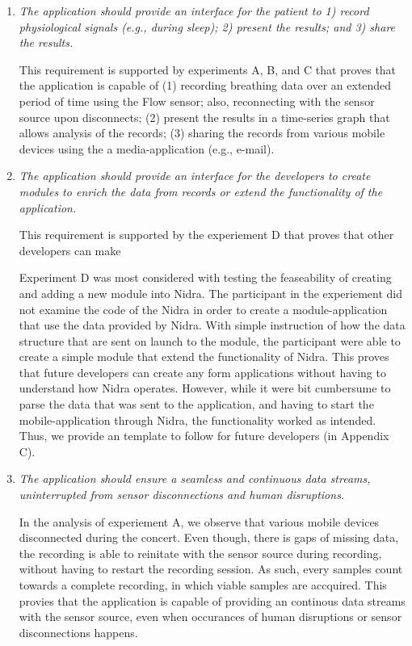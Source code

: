 \begin{enumerate}
    \item \textit{The application should provide an interface for the patient to 1) record physiological signals (e.g., during sleep); 2) present the results; and 3) share the results.}
    
    This requirement is supported by experiments A, B, and C that proves that the application is capable of (1) recording breathing data over an extended period of time using the Flow sensor; also, reconnecting with the sensor source upon disconnects; (2) present the results in a time-series graph that allows analysis of the records; (3) sharing the records from various mobile devices using the a media-application (e.g., e-mail).

    \item \textit{The application should provide an interface for the developers to create modules to enrich the data from records or extend the functionality of the application.}
    
    This requirement is supported by the experiement D that proves that other developers can make 

    Experiment D was most considered with testing the feaseability of creating and adding a new module into Nidra. The participant in the experiement did not examine the code of the Nidra in order to create a module-application that use the data provided by Nidra. With simple instruction of how the data structure that are sent on launch to the module, the participant were able to create a simple module that extend the functionality of Nidra. This proves that future developers can create any form applications without having to understand how Nidra operates. However, while it were bit cumbersume to parse the data that was sent to the application, and having to start the mobile-application through Nidra, the functionality worked as intended. Thus, we provide an template to follow for future developers (in Appendix C). 
    
    \item \textit{The application should ensure a seamless and continuous data streams, uninterrupted from sensor disconnections and human disruptions.}
    
    In the analysis of experiement A, we observe that various mobile devices disconnected during the concert. Even though, there is gaps of missing data, the recording is able to reinitate with the sensor source during recording, without having to restart the recording session. As such, every samples count towards a complete recording, in which viable samples are accquired. This provies that the application is capable of providing an continous data streams with the sensor source, even when occurances of human disruptions or sensor disconnections happens. 
    
\end{enumerate}

